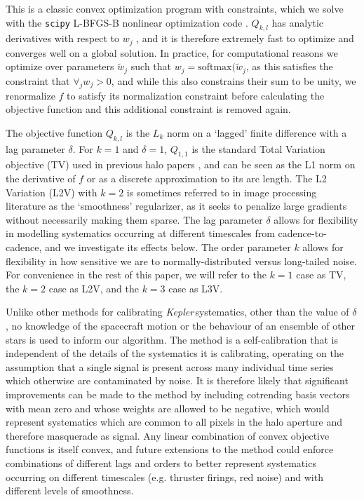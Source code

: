 \documentclass[modern]{aastex62}
\newcommand\kepler{\emph{Kepler}\,}
\begin{document}
This is a classic convex optimization program with constraints, which we solve with the \texttt{scipy} \citep{scipy} L-BFGS-B nonlinear optimization code \citep{lbfgsb}. $Q_{k,l}$ has analytic derivatives with respect to $w_j$ \citep[calculated with \texttt{autograd};][]{autograd}, and it is therefore extremely fast to optimize and converges well on a global solution. In practice, for computational reasons we optimize over parameters $\tilde{w}_j$ such that $w_j = \text{softmax}(\tilde{w}_j$, as this satisfies the constraint that $\forall_j w_j > 0$, and while this also constrains their sum to be unity, we renormalize $f$ to satisfy its normalization constraint before calculating the objective function and this additional constraint is removed again.

The objective function $Q_{k,l}$ is the $L_k$ norm on a `lagged' finite difference with a lag parameter $\delta$. For $k = 1$ and $\delta = 1$, $Q_{1,1}$ is the standard Total Variation objective (TV) used in previous halo papers \citep[e.g.][]{White2017,Farr2018}, and can be seen as the L1 norm on the derivative of $f$ or as a discrete approximation to its arc length. The L2 Variation (L2V) with $k=2$ is sometimes referred to in image processing literature as the `smoothness' regularizer, as it seeks to penalize large gradients without necessarily making them sparse. The lag parameter $\delta$ allows for flexibility in modelling systematics occurring at different timescales from cadence-to-cadence, and we investigate its effects below. The order parameter $k$ allows for flexibility in how sensitive we are to normally-distributed versus long-tailed noise. For convenience in the rest of this paper, we will refer to the $k=1$ case as TV, the $k=2$ case as L2V, and the $k=3$ case as L3V.

Unlike other methods for calibrating \kepler systematics, other than the value of $\delta$, no knowledge of the spacecraft motion or the behaviour of an ensemble of other stars is used to inform our algorithm. The method is a self-calibration that is independent of the details of the systematics it is calibrating, operating on the assumption that a single signal is present across many individual time series which otherwise are contaminated by noise. It is therefore likely that significant improvements can be made to the method by including cotrending basis vectors with mean zero and whose weights are allowed to be negative, which would represent systematics which are common to all pixels in the halo aperture and therefore masquerade as signal. Any linear combination of convex objective functions is itself convex, and future extensions to the method could enforce combinations of different lags and orders to better represent systematics occurring on different timescales (e.g. thruster firings, red noise) and with different levels of smoothness.
\end{document}
